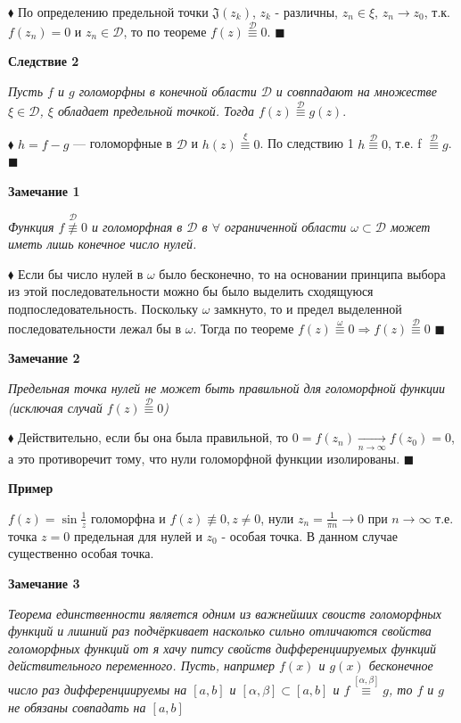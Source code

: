 \documentclass[a4paper, 12pt]{report}
\begin{document}
$\blacklozenge$ По определению предельной точки $\mathfrak{J}(z_k)$, $z_k$ - различны, $z_n \in \xi$, $z_n \to z_0$, т.к. $f(z_n) = 0$ и $z_n \in \mathscr{D}$, то по теореме $f(z) \overset{\mathscr{D}}{\equiv} 0$. $\blacksquare$
\par\bigskip
\textbf{Следствие 2}
\par\bigskip
\textsl{Пусть $f$ и $g$ голоморфны в конечной области $\mathscr{D}$ и совппадают на множестве $\xi \in \mathscr{D}$, $\xi$ обладает предельной точкой. Тогда $f(z) \overset{\mathscr{D}}{\equiv} g(z)$}.
\par\bigskip
$\blacklozenge$ $h = f - g$ --- голоморфные в $\mathscr{D}$ и $h(z) \overset{\xi}{\equiv} 0$. По следствию 1 $h \overset{\mathscr{D}}{\equiv} 0$, т.е. f $\overset{\mathscr{D}}{\equiv} g$. $\blacksquare$
\par\bigskip
\textbf{Замечание 1}
\par\bigskip
\textsl{Функция $f \overset{\mathscr{D}}{\not \equiv} 0$ и голоморфная в $\mathscr{D}$ в $\forall$ ограниченной области $\omega \subset \mathscr{D}$ может иметь лишь конечное число нулей.}
\par\bigskip
$\blacklozenge$ Если бы число нулей в $\omega$ было бесконечно, то на основании принципа выбора из этой последовательности можно бы было выделить сходящуюся подпоследовательность. Поскольку $\omega$ замкнуто, то и предел выделенной последовательности лежал бы в $\omega$. Тогда по теореме $f(z) \overset{\omega}{\equiv} 0 \Rightarrow f(z) \overset{\mathscr{D}}{\equiv} 0$ $\blacksquare$
\par\bigskip
\textbf{Замечание 2}
\par\bigskip
\textsl{Предельная точка нулей не может быть правильной для голоморфной функции (исключая случай $f(z) \overset{\mathscr{D}}{\equiv} 0$)}
\par\bigskip
$\blacklozenge$ Действительно, если бы она была правильной, то $0 = f(z_n) \underset{n \to \infty}{\to} f(z_0) = 0$, а это противоречит тому, что нули голоморфной функции изолированы. $\blacksquare$
\par\bigskip
\textbf{Пример}
\par\bigskip
$f(z) = \sin{\frac{1}{z}}$ голоморфна и $f(z) \not \equiv 0, z \not = 0$, нули $z_n = \frac{1}{\pi n} \to 0$ при $n \to \infty$ т.е. точка $z = 0$ предельная для нулей и $z_0$ - особая точка. В данном случае существенно особая точка.
\par\bigskip
\textbf{Замечание 3}
\par\bigskip
\textsl{Теорема единственности является одним из важнейших своиств голоморфных функций и лишний раз подчёркивает насколько сильно отличаются свойства голоморфных функций от я хачу питсу свойств дифференциируемых функций действительного переменного. Пусть, например $f(x)$ и $g(x)$ бесконечное число раз дифференциируемы на $[a, b]$ и $[\alpha, \beta] \subset [a, b]$ и $f \overset{[\alpha, \beta]}{\equiv} g$, то $f$ и $g$ не обязаны совпадать на $[a, b]$}
\end{document}
